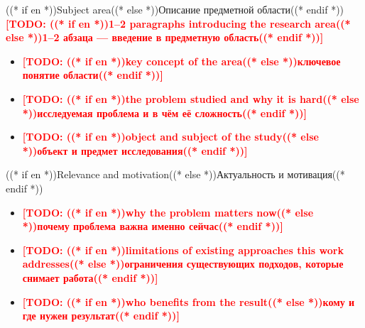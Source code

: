\documentclass[aspectratio=169, 14pt]{beamer}
\newcommand{\todo}[1]{\textcolor{red}{\textbf{[TODO: #1]}}}
\begin{document}
\begin{frame}{((* if en *))Subject area((* else *))Описание предметной области((* endif *))}
  \todo{((* if en *))1--2 paragraphs introducing the research area((* else *))1--2 абзаца — введение в предметную область((* endif *))}

  \vspace{0.4em}
  \begin{itemize}
    \item \todo{((* if en *))key concept of the area((* else *))ключевое понятие области((* endif *))}
    \item \todo{((* if en *))the problem studied and why it is hard((* else *))исследуемая проблема и в чём её сложность((* endif *))}
    \item \todo{((* if en *))object and subject of the study((* else *))объект и предмет исследования((* endif *))}
  \end{itemize}
\end{frame}

\begin{frame}{((* if en *))Relevance and motivation((* else *))Актуальность и мотивация((* endif *))}
  \begin{itemize}
    \item \todo{((* if en *))why the problem matters now((* else *))почему проблема важна именно сейчас((* endif *))}
    \item \todo{((* if en *))limitations of existing approaches this work addresses((* else *))ограничения существующих подходов, которые снимает работа((* endif *))}
    \item \todo{((* if en *))who benefits from the result((* else *))кому и где нужен результат((* endif *))}
  \end{itemize}
\end{frame}
\end{document}
